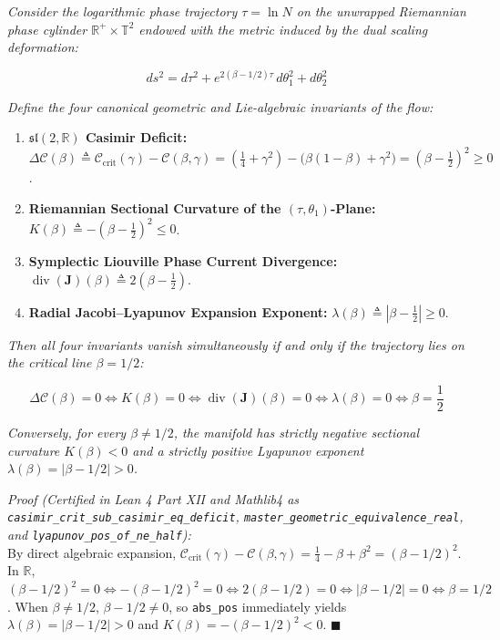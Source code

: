 \documentclass[
  11pt,
]{article}
\providecommand{\tightlist}{%
  \setlength{\itemsep}{0pt}\setlength{\parskip}{0pt}}
\begin{document}
\emph{Consider the logarithmic phase trajectory \(\tau = \ln N\) on the
unwrapped Riemannian phase cylinder \(\mathbb{R}^+ \times \mathbb{T}^2\)
endowed with the metric induced by the dual scaling deformation:}

\[ds^2 = d\tau^2 + e^{2(\beta - 1/2)\tau}\,d\theta_1^2 + d\theta_2^2\]

\emph{Define the four canonical geometric and Lie-algebraic invariants
of the flow:}

\begin{enumerate}
\def\labelenumi{\arabic{enumi}.}
\tightlist
\item
  \textbf{\(\mathfrak{sl}(2, \mathbb{R})\) Casimir Deficit:}
  \(\Delta \mathcal{C}(\beta) \triangleq \mathcal{C}_{\text{crit}}(\gamma) - \mathcal{C}(\beta, \gamma) = \left(\frac{1}{4} + \gamma^2\right) - \big(\beta(1-\beta) + \gamma^2\big) = \left(\beta - \frac{1}{2}\right)^2 \ge 0\).
\item
  \textbf{Riemannian Sectional Curvature of the
  \((\tau, \theta_1)\)-Plane:}
  \(K(\beta) \triangleq -\left(\beta - \frac{1}{2}\right)^2 \le 0\).
\item
  \textbf{Symplectic Liouville Phase Current Divergence:}
  \(\operatorname{div}(\mathbf{J})(\beta) \triangleq 2\left(\beta - \frac{1}{2}\right)\).
\item
  \textbf{Radial Jacobi--Lyapunov Expansion Exponent:}
  \(\lambda(\beta) \triangleq \left|\beta - \frac{1}{2}\right| \ge 0\).
\end{enumerate}

\emph{Then all four invariants vanish simultaneously if and only if the
trajectory lies on the critical line \(\beta = 1/2\):}

\[\Delta \mathcal{C}(\beta) = 0 \iff K(\beta) = 0 \iff \operatorname{div}(\mathbf{J})(\beta) = 0 \iff \lambda(\beta) = 0 \iff \boxed{\beta = \frac{1}{2}}\]

\emph{Conversely, for every \(\beta \neq 1/2\), the manifold has
strictly negative sectional curvature \(K(\beta) < 0\) and a strictly
positive Lyapunov exponent \(\lambda(\beta) = |\beta - 1/2| > 0\).}

\emph{Proof (Certified in Lean 4 Part XII and Mathlib4 as
\texttt{casimir\_crit\_sub\_casimir\_eq\_deficit},
\texttt{master\_geometric\_equivalence\_real}, and
\texttt{lyapunov\_pos\_of\_ne\_half}):}\\
By direct algebraic expansion,
\(\mathcal{C}_{\text{crit}}(\gamma) - \mathcal{C}(\beta, \gamma) = \frac{1}{4} - \beta + \beta^2 = (\beta - 1/2)^2\).
In \(\mathbb{R}\),
\((\beta - 1/2)^2 = 0 \iff -(\beta - 1/2)^2 = 0 \iff 2(\beta - 1/2) = 0 \iff |\beta - 1/2| = 0 \iff \beta = 1/2\).
When \(\beta \neq 1/2\), \(\beta - 1/2 \neq 0\), so \texttt{abs\_pos}
immediately yields \(\lambda(\beta) = |\beta - 1/2| > 0\) and
\(K(\beta) = -(\beta - 1/2)^2 < 0\). \(\blacksquare\)
\end{document}
